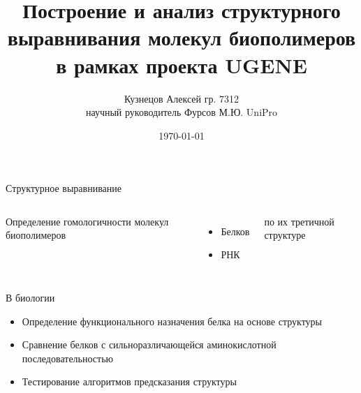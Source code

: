 \documentclass[utf8]{beamer}
\title[Построение структурного выравнивания]{Построение и анализ структурного выравнивания молекул биополимеров в рамках проекта UGENE}
\author[Кузнецов Алексей]{Кузнецов Алексей гр. 7312\\научный руководитель Фурсов М.Ю. UniPro}
\institute{Новосибирский Государственный Университет}
\date{\today}
\begin{document}

\begin{frame}
\titlepage
\end{frame}

\begin{frame}{Структурное выравнивание}
\begin{columns}[c]
	Определение гомологичности молекул биополимеров
	\begin{itemize}
		\item Белков
		\item РНК
	\end{itemize}
	по их третичной структуре

\end{columns}


\end{frame}

\begin{frame}{В биологии}
\begin{itemize}
	\item Определение функционального назначения белка на основе структуры
	\item Сравнение белков с сильноразличающейся аминокислотной последовательностью
	\item Тестирование алгоритмов предсказания структуры
\end{itemize}
\end{frame}
\end{document}
